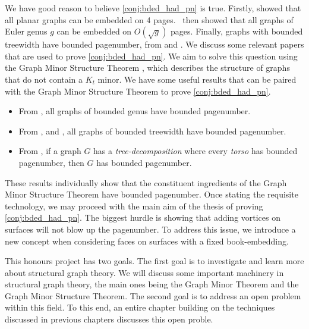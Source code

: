 We have good reason to believe \cref{conj:bded_had_pn} is true. Firstly, \textcite{yannakakisEmbeddingPlanarGraphs1989} showed that all planar graphs can be embedded on 4 pages.\ \textcite{malitzGenusGraphsHave1994} then showed that all graphs of Euler genus $g$ can be embedded on $O(\sqrt{g})$ pages. Finally, graphs with bounded treewidth have bounded pagenumber, from \textcite{ganleyPagenumberTrees2001} and \textcite{dujmovicGraphTreewidthGeometric2007}.
We discuss some relevant papers that are used to prove \cref{conj:bded_had_pn}.
We aim to solve this question using the Graph Minor Structure Theorem \cite{robertsonGraphMinorsXVI2003}, which describes the structure of graphs that do not contain a \(K_t\) minor. 
We have some useful results that can be paired with the Graph Minor Structure Theorem to prove \cref{conj:bded_had_pn}.
\begin{itemize}
	\item From \textcite{heathPagenumberGenusGraphs1992}, all graphs of bounded genus have bounded pagenumber.
	\item From \textcite{ganleyPagenumberTrees2001}, and \textcite{dujmovicGraphTreewidthGeometric2007}, all graphs of bounded treewidth have bounded pagenumber.
	\item From \textcite{hickingbothamStackNumberCliqueSum2023}, if a graph \(G\) has a \textit{tree-decomposition} where every \textit{torso} has bounded pagenumber, then \(G\) has bounded pagenumber.
\end{itemize}
These results individually show that the constituent ingredients of the Graph Minor Structure Theorem have bounded pagenumber. Once stating the requisite technology, we may proceed with the main aim of the thesis of proving \cref{conj:bded_had_pn}. 
The biggest hurdle is showing that adding vortices on surfaces will not blow up the pagenumber. To address this issue, we introduce a new concept when considering faces on surfaces with a fixed book-embedding. 

This honours project has two goals. The first goal is to investigate and learn more about structural graph theory. We will discuss some important machinery in structural graph theory, the main ones being the Graph Minor Theorem and the Graph Minor Structure Theorem. The second goal is to address an open problem within this field. To this end, an entire chapter building on the techniques discussed in previous chapters discusses this open proble. 

